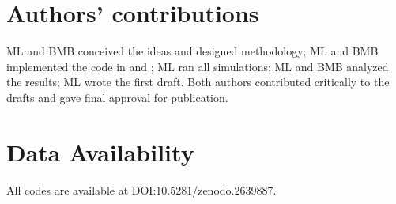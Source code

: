 \documentclass[12pt]{article}
\begin{document}
\section*{Authors’ contributions}

ML and BMB conceived the ideas and designed methodology; ML and BMB implemented the code in  and ; ML ran all simulations; ML and BMB analyzed the results; ML wrote the first draft. Both authors contributed critically to the drafts and gave final approval for publication.

\section*{Data Availability}

All codes are available at DOI:10.5281/zenodo.2639887.


\end{document}
